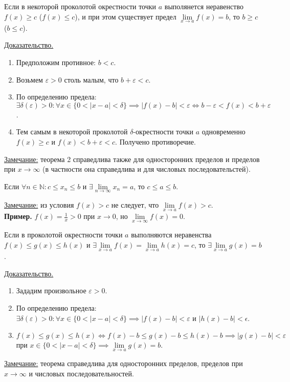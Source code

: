 \documentclass{article}
\begin{document}
\begin{theorem}
    Если в некоторой проколотой окрестности точки \(a\) выполянется неравенство \(f(x) \geq c\) (\(f(x) \leq c\)), и при этом существует предел \(\lim\limits_{x \to a}f(x) = b\), то \(b \geq c\) (\(b \leq c\)).    
\end{theorem}
\noindent 
\underline{Доказательство.}
\begin{enumerate}
    \item Предположим противное: \(b < c\).
    \item Возьмем \(\varepsilon > 0\) столь малым, что \(b + \varepsilon < c\).
    \item По определению предела: \(\exists \delta(\varepsilon) > 0: \forall x \in \{0 < \vert x - a \vert < \delta\} \implies \vert f(x) - b \vert < \varepsilon \iff b - \varepsilon < f(x) < b + \varepsilon\).
    \item Тем самым в некоторой проколотой \(\delta\)-окрестности точки \(a\) одновременно \(f(x) \geq c\) и \(f(x) < b + \varepsilon < c\). Получено противоречие.   
\end{enumerate}
\noindent
\underline{Замечание:} теорема 2 справедлива также для односторонних пределов и пределов при \(x \to \infty\) (в частности она справедлива и для числовых последовательстей). 

\begin{theorem}
    Если \(\forall n \in \mathbb{N}: c \leq x_{n} \leq b\) и \(\exists \lim\limits_{n \to \infty}x_{n} = a\), то \(c \leq a \leq b\).   
\end{theorem}
\noindent
\underline{Замечание:} из условия \(f(x) > c\) не следует, что \(\lim\limits_{x \to a}f(x) > c\).\\
\textbf{Пример.} \(\displaystyle f(x) = \frac{1}{x} > 0\) при \(x \to 0\), но \(\lim\limits_{x \to \infty}f(x) = 0\).

\begin{theorem}
    Если в проколотой окрестности точки \(a\) выполняются неравенства \(f(x) \leq g(x) \leq h(x)\) и \(\exists \lim\limits_{x \to a}f(x) = \lim\limits_{x \to a}h(x) = c\),
    то \(\exists \lim\limits_{x \to a}g(x) = b\).    
\end{theorem}
\noindent
\underline{Доказательство.}
\begin{enumerate}
    \item Зададим произвольное \(\varepsilon > 0\).
    \item По определению предела: \(\exists \delta(\varepsilon) > 0: \forall x \in \{0 < \vert x - a \vert < \delta\} \implies \vert f(x) - b \vert < \varepsilon\) и \(\vert h(x) - b \vert < \epsilon\). 
    \item \(f(x) \leq g(x) \leq h(x) \iff f(x) - b \leq g(x) - b \leq h(x) - b \implies \vert g(x) - b \vert < \varepsilon\) при \(x \in \{0 < \vert x - a \vert < \delta\} \implies \lim\limits_{x \to a}g(x) = b\). 
\end{enumerate}
\noindent
\underline{Замечание:} теорема справедлива для односторонних пределов, пределов при \(x \to \infty\) и числовых последовательностей.
\end{document}
